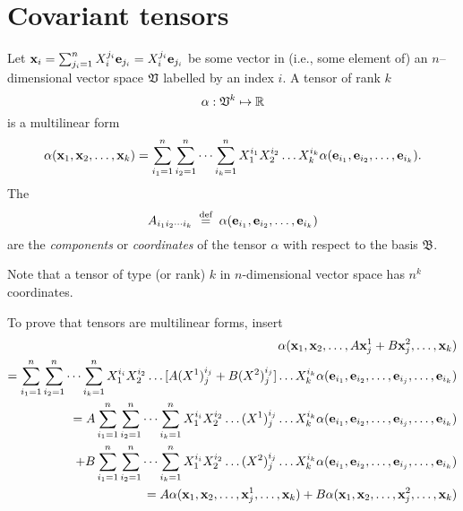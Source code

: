\section{Covariant tensors}
Let  ${\bf x}_i =\sum_{j_i=1}^n X^{j_i}_i {\bf e}_{j_i} =X^{j_i}_i {\bf e}_{j_i}$
be some vector in (i.e., some element of) an $n$--dimensional vector space ${\frak V}$ labelled by an index $i$.
A tensor of rank $k$
\begin{equation}
\alpha:{ \frak V }^k \mapsto {\Bbb R}
\end{equation}
is a multilinear form
\begin{equation}
\alpha ( {\bf x}_1,{\bf x}_2,\ldots ,{\bf x}_k)=
\sum_{i_1=1}^n
\sum_{i_2=1}^n
\cdots
\sum_{i_k=1}^n
X^{i_1}_1 X^{i_2}_2\ldots X^{i_k}_k
\alpha ( {\bf e}_{i_1},{\bf e}_{i_2},\ldots ,{\bf e}_{i_k}).
\end{equation}
The
\begin{equation}
A_{{i_1}{i_2}\cdots {i_k}}
\stackrel{{\tiny \textrm{ def }}}{=}
\alpha ( {\bf e}_{i_1},{\bf e}_{i_2},\ldots ,{\bf e}_{i_k})
\end{equation}
 are the
{\em components} or
{\em coordinates}
of the tensor $\alpha $ with respect to the basis
${\mathfrak B}$.

Note that a tensor of type (or rank) $k$ in $n$-dimensional vector space has $n^k$  coordinates.

{\color{OliveGreen}
\bproof
To prove that tensors are multilinear forms, insert
\begin{equation}
\begin{split}
 \alpha ( {\bf x}_1,{\bf x}_2,\ldots , A{\bf x}^1_j+B{\bf x}_j^2,\ldots ,{\bf x}_k)
\\
=
\sum_{i_1=1}^n
\sum_{i_2=1}^n
\cdots
\sum_{i_k=1}^n
X^{i_i}_1X^{i_2}_2\ldots  [A(X^1)^{i_j}_j+B(X^2)^{i_j}_j]\ldots X^{i_k}_k
\alpha ( {\bf e}_{i_1},{\bf e}_{i_2},\ldots,{\bf e}_{i_j},\ldots ,{\bf e}_{i_k})
\\
= A
\sum_{i_1=1}^n
\sum_{i_2=1}^n
\cdots
\sum_{i_k=1}^n
X^{i_i}_1X^{i_2}_2\ldots  (X^1)^{i_j}_j\ldots X^{i_k}_k
\alpha ( {\bf e}_{i_1},{\bf e}_{i_2},\ldots,{\bf e}_{i_j},\ldots ,{\bf e}_{i_k})
\\
\quad +
B
\sum_{i_1=1}^n
\sum_{i_2=1}^n
\cdots
\sum_{i_k=1}^n
X^{i_i}_1X^{i_2}_2\ldots  (X^2)^{i_j}_j\ldots X^{i_k}_k
\alpha ( {\bf e}_{i_1},{\bf e}_{i_2},\ldots,{\bf e}_{i_j},\ldots ,{\bf e}_{i_k})
\\
=
A \alpha ( {\bf x}_1,{\bf x}_2,\ldots , {\bf x}^1_j,\ldots ,{\bf x}_k)+
B \alpha ( {\bf x}_1,{\bf x}_2,\ldots , {\bf x}_j^2,\ldots ,{\bf x}_k)\nonumber
\end{split}
\end{equation}
\eproof
}

